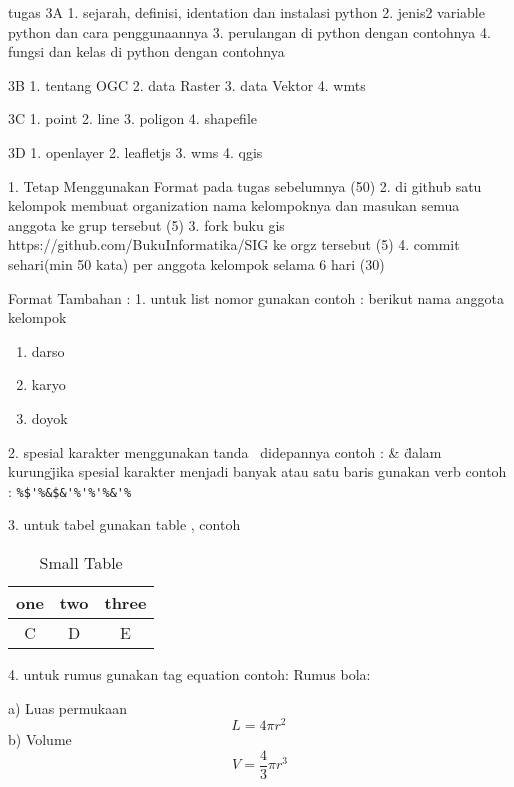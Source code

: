 tugas
3A
1. sejarah, definisi, identation dan instalasi python
2. jenis2 variable python dan cara penggunaannya
3. perulangan di python dengan contohnya
4. fungsi dan kelas di python dengan contohnya


3B 
1. tentang OGC
2. data Raster
3. data Vektor
4. wmts

3C
1. point
2. line
3. poligon
4. shapefile

3D
1. openlayer
2. leafletjs
3. wms
4. qgis




1. Tetap Menggunakan Format pada tugas sebelumnya (50)
2. di github satu kelompok membuat organization nama kelompoknya dan masukan semua anggota ke grup tersebut (5)
3. fork buku gis https://github.com/BukuInformatika/SIG ke orgz tersebut (5)
4. commit sehari(min 50 kata) per anggota kelompok selama 6 hari (30)




Format Tambahan :
1. untuk list nomor gunakan
	contoh :
	berikut nama anggota kelompok
\begin{enumerate}
	\item darso
	\item karyo
	\item doyok
\end{enumerate}

2. spesial karakter menggunakan tanda \ didepannya
	contoh :
	\&
	\"dalam kurung\"
	jika spesial karakter menjadi banyak atau satu baris gunakan verb
	contoh :
	\verb|%$'%&$&'%'%'%&'%|
	
3. untuk tabel gunakan table , contoh

\begin{table}[h]
\caption{Small Table}
\centering
\begin{tabular}{ccc}
\hline
one&two&three\\
\hline
C&D&E\\
\hline
\end{tabular}
\end{table}

4. untuk rumus gunakan tag equation
	contoh:
	Rumus bola:

	a) Luas permukaan
	 \begin{equation}
	     L = 4 \pi r^2 \,
	\end{equation}
	b) Volume
	 \begin{equation}
	     V = \frac{4}{3}\pi r^3
	\end{equation}